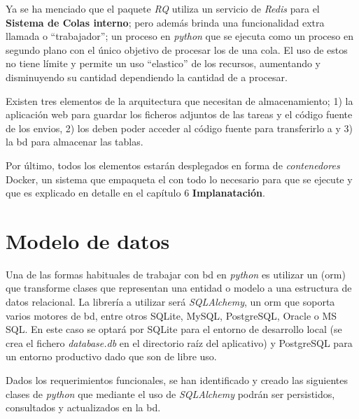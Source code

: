 \documentclass[11pt,spanish,listoffigures,listoftables]{tfgetsinf}
\begin{document}
Ya se ha menciado que el \gls{paquete} \textit{RQ} utiliza un servicio de \textit{Redis} para el \textbf{Sistema de Colas interno}; pero además brinda una funcionalidad extra llamada  o ``trabajador''; un proceso en \textit{python} que se ejecuta como un proceso en segundo plano con el único objetivo de procesar los  de una \gls{cola}. El uso de estos  no tiene límite y permite un uso ``elastico'' de los recursos, aumentando y disminuyendo su cantidad dependiendo la cantidad de  a procesar.

Existen tres elementos de la arquitectura que necesitan de almacenamiento; 1) la aplicación web para guardar los ficheros adjuntos de las \gls{tarea}s y el código fuente de los \gls{envio}s, 2) los  deben poder acceder al código fuente para transferirlo a \kahan y 3) la \acrlong{bd} para almacenar las tablas.

Por último, todos los elementos estarán desplegados en forma de \textit{contenedores} Docker, un sistema que empaqueta el  con todo lo necesario para que se ejecute y que es explicado en detalle en el capítulo 6 \textbf{Implanatación}.

\section {Modelo de datos}

Una de las formas habituales de trabajar con \acrshort{bd} en \textit{python} es utilizar un  (\acrshort{orm})  que transforme clases que representan una entidad o modelo a una estructura de datos relacional. La librería a utilizar será \textit{SQLAlchemy}, un \acrshort{orm} que soporta varios motores de \acrshort{bd}, entre otros SQLite, MySQL, PostgreSQL, Oracle o MS SQL. En este caso se optará por SQLite para el entorno de desarrollo local (se crea el fichero \textit{database.db} en el directorio raíz del aplicativo) y PostgreSQL para un entorno productivo dado que son de libre uso.

Dados los requerimientos funcionales, se han identificado y creado las siguientes clases de \textit{python} que mediante el uso de \textit{SQLAlchemy} podrán ser persistidos, consultados y actualizados en la \acrfull{bd}.
\end{document}
